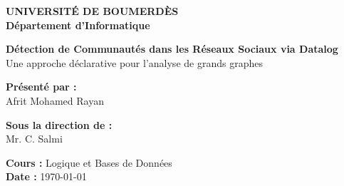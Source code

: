 \documentclass[12pt,a4paper]{report}
\begin{document}

\begin{center}

    {\Large \textbf{UNIVERSITÉ DE BOUMERDÈS}}\\
    \vspace{0.2cm}
    {\large \textbf{Département d’Informatique}}\\
    
    \vspace{2cm}

    {\Huge \textbf{Détection de Communautés dans les Réseaux Sociaux via Datalog}}\\
    \vspace{0.5cm}
    {\large Une approche déclarative pour l'analyse de grands graphes}\\
    
    \vspace{2cm}

    \textbf{Présenté par :}\\
    Afrit Mohamed Rayan\\
    
    \vspace{1cm}

    \textbf{Sous la direction de :}\\
    Mr. C. Salmi\\
    
    \vspace{2cm}

    \textbf{Cours :} Logique et Bases de Données\\
    \textbf{Date :} \today

\end{center}


\begin{abstract}
Ce rapport explore l'application du langage de programmation logique \textbf{Datalog} pour la détection de communautés dans les réseaux sociaux. Contrairement aux approches impératives traditionnelles, Datalog permet d'exprimer des algorithmes complexes, tels que la \textbf{Propagation de Labels (LPA)}, les \textbf{Composantes Connexes}, et la \textbf{Centralité de Degré}, de manière purement déclarative. En utilisant le moteur de haute performance \textbf{Soufflé}, nous démontrons comment la logique récursive facilite l'analyse structurelle des graphes tout en garantissant une parallélisation efficace. Les résultats, évalués via la métrique de \textbf{Modularité}, confirment que Datalog offre une alternative concise et rigoureuse pour le traitement des données massives issues des réseaux sociaux.
\end{abstract}
\end{document}
